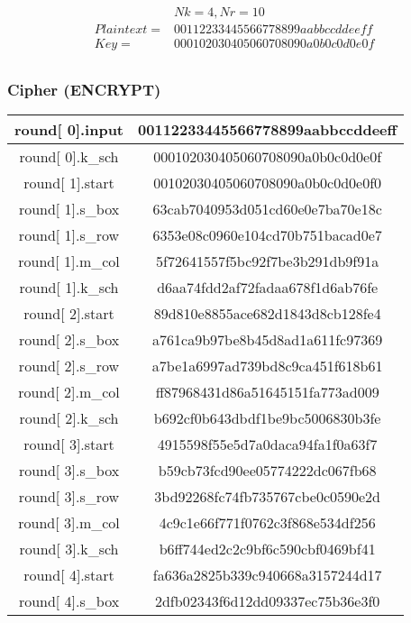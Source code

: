 \begin{align*}
&Nk=4, Nr=10 \\
Plaintext = &00112233445566778899aabbccddeeff \\
Key = &000102030405060708090a0b0c0d0e0f \\
\end{align*}

\subsubsection{Cipher (ENCRYPT)}

\begin{center}
\begin{longtable}{ |c|c| } 
\hline
round[ 0].input &  00112233445566778899aabbccddeeff \\
\hline
round[ 0].k\_sch &  000102030405060708090a0b0c0d0e0f\\
\hline
round[ 1].start &  00102030405060708090a0b0c0d0e0f0\\
\hline
round[ 1].s\_box &  63cab7040953d051cd60e0e7ba70e18c\\
\hline
round[ 1].s\_row &  6353e08c0960e104cd70b751bacad0e7\\
\hline
round[ 1].m\_col &  5f72641557f5bc92f7be3b291db9f91a\\
\hline
round[ 1].k\_sch &  d6aa74fdd2af72fadaa678f1d6ab76fe\\
\hline
round[ 2].start &  89d810e8855ace682d1843d8cb128fe4\\
\hline
round[ 2].s\_box &  a761ca9b97be8b45d8ad1a611fc97369\\
\hline
round[ 2].s\_row  & a7be1a6997ad739bd8c9ca451f618b61\\
\hline
round[ 2].m\_col  & ff87968431d86a51645151fa773ad009\\
\hline
round[ 2].k\_sch  & b692cf0b643dbdf1be9bc5006830b3fe\\
\hline
round[ 3].start  & 4915598f55e5d7a0daca94fa1f0a63f7\\
\hline
round[ 3].s\_box  & b59cb73fcd90ee05774222dc067fb68\\
\hline
round[ 3].s\_row  & 3bd92268fc74fb735767cbe0c0590e2d\\
\hline
round[ 3].m\_col  & 4c9c1e66f771f0762c3f868e534df256\\
\hline
round[ 3].k\_sch  & b6ff744ed2c2c9bf6c590cbf0469bf41\\
\hline
round[ 4].start  & fa636a2825b339c940668a3157244d17\\
\hline
round[ 4].s\_box  & 2dfb02343f6d12dd09337ec75b36e3f0\\

\end{longtable}
\end{center}
